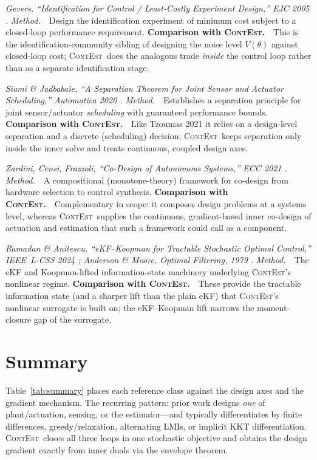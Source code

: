 \documentclass[11pt]{article}
\newcommand{\Th}{\theta}
\newcommand{\ContEst}{\textsc{ContEst}}
\newcommand{\Method}{\smallskip\noindent\textit{Method.}~}
\newcommand{\Versus}{\smallskip\noindent\textbf{Comparison with \ContEst.}~}
\begin{document}
\noindent\emph{Gevers, ``Identification for Control / Least-Costly Experiment
Design,'' EJC 2005 \cite{gevers2005identification}.}
\Method\ Design the identification experiment of minimum cost subject to a
closed-loop performance requirement. \Versus\ This is the identification-community
sibling of designing the noise level $V(\Th)$ against closed-loop cost; \ContEst\
does the analogous trade \emph{inside} the control loop rather than as a separate
identification stage.

\smallskip
\noindent\emph{Siami \& Jadbabaie, ``A Separation Theorem for Joint Sensor and
Actuator Scheduling,'' Automatica 2020 \cite{siami2021separation}.}
\Method\ Establishes a separation principle for joint sensor/actuator
\emph{scheduling} with guaranteed performance bounds. \Versus\ Like Tzoumas 2021 it
relies on a design-level separation and a discrete (scheduling) decision; \ContEst\
keeps separation only inside the inner solve and treats continuous, coupled design
axes.

\smallskip
\noindent\emph{Zardini, Censi, Frazzoli, ``Co-Design of Autonomous Systems,'' ECC
2021 \cite{zardini2021codesign}.}
\Method\ A compositional (monotone-theory) framework for co-design from hardware
selection to control synthesis. \Versus\ Complementary in scope: it composes
design problems at a systems level, whereas \ContEst\ supplies the continuous,
gradient-based inner co-design of actuation and estimation that such a framework
could call as a component.

\smallskip
\noindent\emph{Ramadan \& Anitescu, ``eKF--Koopman for Tractable Stochastic Optimal
Control,'' IEEE~L-CSS 2024 \cite{ramadan2024extended}; Anderson \& Moore,
\emph{Optimal Filtering}, 1979 \cite{anderson2012optimal}.}
\Method\ The eKF and Koopman-lifted information-state machinery underlying
\ContEst's nonlinear regime. \Versus\ These provide the tractable information state
(and a sharper lift than the plain eKF) that \ContEst's nonlinear surrogate is built
on; the eKF--Koopman lift narrows the moment-closure gap of the surrogate.

\section{Summary}\label{sec:summary}

Table~\ref{tab:summary} places each reference class against the design axes and the
gradient mechanism. The recurring pattern: prior work designs \emph{one} of
plant/actuation, sensing, or the estimator---and typically differentiates by finite
differences, greedy/relaxation, alternating LMIs, or implicit KKT differentiation.
\ContEst\ closes all three loops in one stochastic objective and obtains the design
gradient exactly from inner duals via the envelope theorem.
\end{document}
